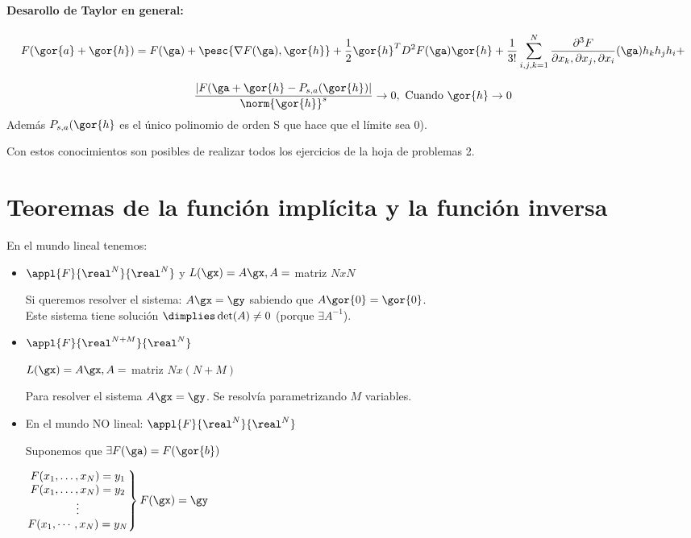 \documentclass{apuntes}
\begin{document}
\paragraph{Desarollo de Taylor en general:}

$$F(\gor{a}+\gor{h}) = F(\ga) + \pesc{\nabla F(\ga),\gor{h}} + \frac{1}{2} \gor{h}^T D^2F(\ga)\gor{h} + \frac{1}{3!}\sum_{i,j,k=1}^N \frac{\partial^3F}{\partial x_k,\partial x_j, \partial x_i} (\ga) h_kh_jh_i + $$

\begin{theorem}
 $$\frac{|F(\ga+\gor{h} - P_{s,a}(\gor{h})|}{\norm{\gor{h}}^s} \rightarrow 0, \text{ Cuando } \gor{h} \rightarrow 0$$
 Además $P_{s,a}(\gor{h}$ es el único polinomio de orden S que hace que el límite sea 0).
\end{theorem}

Con estos conocimientos son posibles de realizar todos los ejercicios de la hoja de problemas 2.

\section{Teoremas de la función implícita y la función inversa}

En el mundo lineal tenemos: 

\begin{itemize} \item $\appl{F}{\real^N}{\real^N}$ y 
$L(\gx) = A\gx,  A = $ matriz $NxN$


Si queremos resolver el sistema: $A\gx = \gy$ sabiendo que $A\gor{0} = \gor{0}$.\\ Este sistema tiene solución $\dimplies \det(A) \neq 0$ (porque $\exists A^{-1}$).
\item
$\appl{F}{\real^{N+M}}{\real^N}$

$L(\gx) = A\gx, A = $ matriz $Nx(N+M)$

Para resolver el sistema $A\gx = \gy$.  Se resolvía parametrizando $M$ variables.

\item En el mundo NO lineal:
$\appl{F}{\real^N}{\real^N}$

Suponemos que $\exists F(\ga) = F(\gor{b})$

$\left.\begin{matrix}
F(x_1,\dotsc,x_N) = y_1\\
F(x_1,\dotsc,x_N) = y_2\\
\vdots\\
F(x_1,\cdots,x_N) = y_N          
        \end{matrix}
\right\} F(\gx)=\gy$
\end{itemize}
\end{document}
